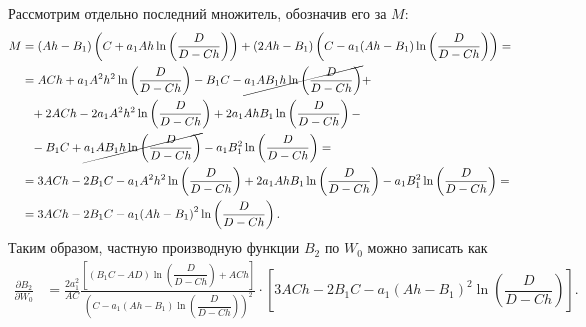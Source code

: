\documentclass[a4paper,14pt]{article}
\begin{document}
Рассмотрим отдельно последний множитель, обозначив его за $M$:
\begin{equation*}
  \begin{aligned}
    M
    &=
    (A h - B_1)
    \left(
    C + a_1 A h
    \ln \left( \dfrac{D}{D - C h} \right)
    \right)
    +
    (2 A h - B_1)
    \left(
    C - a_1 (A h - B_1)
    \ln \left( \dfrac{D}{D - C h} \right)
    \right) = \\
    &=
      A C h + a_1 A^2 h^2
      \ln \left( \dfrac{D}{D - C h} \right)
      - B_1 C
      -
      \cancel{
      a_1 A B_1 h
      \ln \left( \dfrac{D}{D - C h} \right)
      }+
    \\
    &\phantom{=}
      +
      2 A C h
      - 2 a_1 A^2 h^2
      \ln \left( \dfrac{D}{D - C h} \right)
      + 2 a_1 A h B_1
      \ln \left( \dfrac{D}{D - C h} \right) -
    \\
    &\phantom{=}
      -
      B_1 C
      +
      \cancel{
      a_1 A B_1 h
      \ln \left( \dfrac{D}{D - C h} \right)
      }
      - a_1 B_1^2
      \ln \left( \dfrac{D}{D - C h} \right) = \\
    &=
      3 A C h - 2 B_1 C
      - a_1 A^2 h^2
      \ln \left( \dfrac{D}{D - C h} \right)
      + 2 a_1 A h B_1
      \ln \left( \dfrac{D}{D - C h} \right)
      - a_1 B_1^2
      \ln \left( \dfrac{D}{D - C h} \right) = \\
    &=
      3 A C h - 2 B_1 C
      - a_1 {\left(A h - B_1 \right)}^2
      \ln \left( \dfrac{D}{D - C h} \right).
  \end{aligned}
\end{equation*}
Таким образом, частную производную функции $B_2$ по $W_0$
можно записать как
\begin{equation*}
  \begin{aligned}
    \frac{\partial B_2}{\partial W_0}
    &=
      \frac{2 a_1^2}{A C}
      \frac{
      \left[
      \left(B_1 C - A D \right)
      \ln \left( \dfrac{D}{D - C h} \right)
      + A C h
      \right]
      }{
      {\left(
      C - a_1 (A h - B_1)
      \ln \left( \dfrac{D}{D - C h} \right)
      \right)}^2
      }
      \cdot
      \left[
      3 A C h - 2 B_1 C
      - a_1 {\left(A h - B_1 \right)}^2
      \ln \left( \dfrac{D}{D - C h} \right)
      \right].
  \end{aligned}
\end{equation*}
\end{document}
